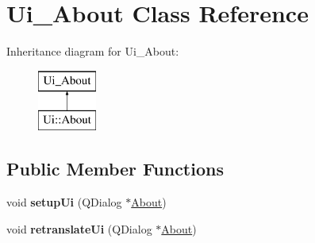 \hypertarget{classUi__About}{\section{Ui\-\_\-\-About Class Reference}
\label{classUi__About}
}
Inheritance diagram for Ui\-\_\-\-About\-:\begin{figure}[H]
\begin{center}
\leavevmode
\includegraphics[height=2.000000cm]{classUi__About}
\end{center}
\end{figure}
\subsection*{Public Member Functions}
\begin{DoxyCompactItemize}
\item 
\hypertarget{classUi__About_a3f702c543d46b79f0d687e8a7711ebcb}{void {\bfseries setup\-Ui} (Q\-Dialog $\ast$\hyperlink{classAbout}{About})}\label{classUi__About_a3f702c543d46b79f0d687e8a7711ebcb}

\item 
\hypertarget{classUi__About_a6b1d5029f1ef8200024e6bf6b4fcebfc}{void {\bfseries retranslate\-Ui} (Q\-Dialog $\ast$\hyperlink{classAbout}{About})}\label{classUi__About_a6b1d5029f1ef8200024e6bf6b4fcebfc}

\end{DoxyCompactItemize}
